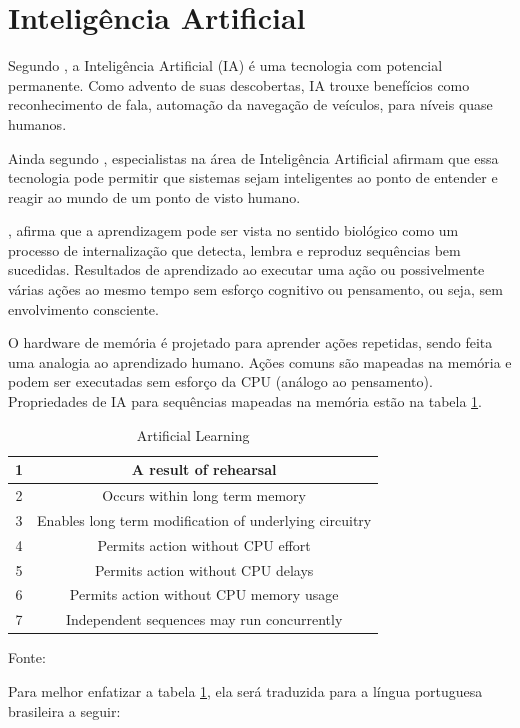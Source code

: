 \section{Inteligência Artificial}

Segundo \cite{anthes}, a Inteligência Artificial (IA) é uma tecnologia com potencial permanente. Como advento de suas descobertas, IA trouxe benefícios como reconhecimento de fala, automação da navegação de veículos, para níveis quase humanos.

Ainda segundo \cite{anthes}, especialistas na área de Inteligência Artificial afirmam que essa tecnologia pode permitir que sistemas sejam inteligentes ao ponto de entender e reagir ao mundo de um ponto de visto humano. 

\cite{john}, afirma que a aprendizagem pode ser vista no sentido biológico como um processo de internalização que detecta, lembra e reproduz sequências bem sucedidas. Resultados de aprendizado ao executar uma ação ou possivelmente várias ações ao mesmo tempo sem esforço cognitivo ou pensamento, ou seja, sem envolvimento consciente.

O hardware de memória é projetado para aprender ações repetidas, sendo feita uma analogia ao aprendizado humano. Ações comuns são mapeadas na memória e podem ser executadas sem esforço da CPU (análogo ao pensamento). Propriedades de IA para sequências mapeadas na memória estão na tabela \ref{tab:artificial}.

\begin{table}[H]
\centering
\begin{tabular}{|c|c|}
\hline
1 & A result of rehearsal                    \\ \hline
2 & Occurs within long term memory \\ \hline
3 & Enables long term modification of underlying circuitry \\ \hline
4 & Permits action without CPU effort \\ \hline
5 & Permits action without CPU delays \\ \hline
6 & Permits action without CPU memory usage \\ \hline
7 & Independent sequences may run concurrently \\ \hline
\end{tabular}
\caption{Artificial Learning}
Fonte: \cite{john}
\label{tab:artificial}
\end{table}

Para melhor enfatizar a tabela \ref{tab:artificial}, ela será traduzida para a língua portuguesa brasileira a seguir:

